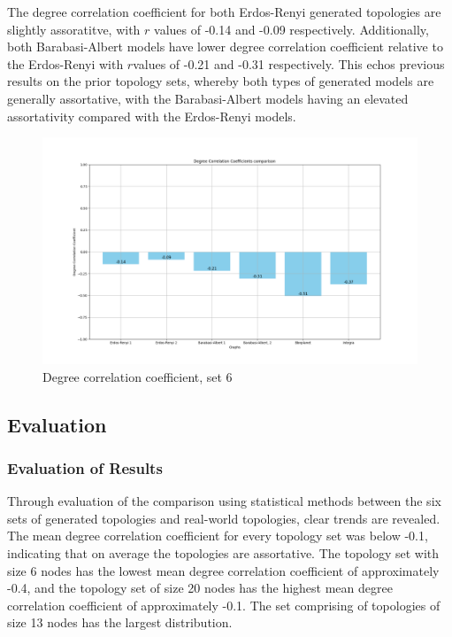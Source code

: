 The degree correlation coefficient for both Erdos-Renyi generated topologies are slightly assoratitve, with $r$ values of -0.14 and -0.09 respectively. Additionally, both Barabasi-Albert models have lower degree correlation coefficient relative to the Erdos-Renyi with $r $values of -0.21 and -0.31 respectively. This echos previous results on the prior topology sets, whereby both types of generated models are generally assortative, with the Barabasi-Albert models having an elevated assortativity compared with the Erdos-Renyi models. 

\begin{figure}
    \centering
    \includegraphics[width=0.9\linewidth]{images/FINAL-TOPO-COMP/Degree-correlation-coeff/deg-coeff-27.png}
    \caption{Degree correlation coefficient, set 6}
    \label{fig:enter-label}
\end{figure}

\subsection{Evaluation}
\subsubsection{Evaluation of Results}
Through evaluation of the comparison using statistical methods between the six sets of generated topologies and real-world topologies, clear trends are revealed. The mean degree correlation coefficient for every topology set was below -0.1, indicating that on average the topologies are assortative. The topology set with size 6 nodes has the lowest mean degree correlation coefficient of approximately -0.4, and the topology set of size 20 nodes has the highest mean degree correlation coefficient of approximately -0.1. The set comprising of topologies of size 13 nodes has the largest distribution.    

